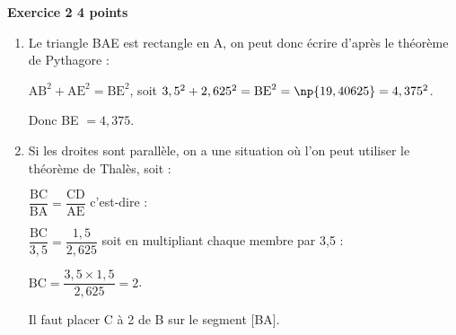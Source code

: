 \textbf{Exercice 2 \hfill 4 points}

\medskip

%
%

\begin{enumerate}
\item %
Le triangle BAE est rectangle en A, on peut donc écrire d'après le théorème de Pythagore :

$\text{AB}^2 + \text{AE}^2  = \text{BE}^2$, soit $3,5^2 + 2,625^2 = \text{BE}^2 = \np{19,40625} = 4,375^2$.

Donc BE $ = 4,375$.
\item %

Si les droites sont parallèle, on a une situation où l'on peut utiliser le théorème de Thalès, soit :

$\dfrac{\text{BC}}{\text{BA}} =  \dfrac{\text{CD}}{\text{AE}}$ c'est-dire :

$\dfrac{\text{BC}}{3,5} =  \dfrac{1,5}{2,625}$ soit en multipliant chaque membre par 3,5  :

$\text{BC} = \dfrac{3,5 \times 1,5}{2,625}  = 2$.

Il faut placer C à 2 de B sur le segment [BA].
\end{enumerate}

\bigskip

